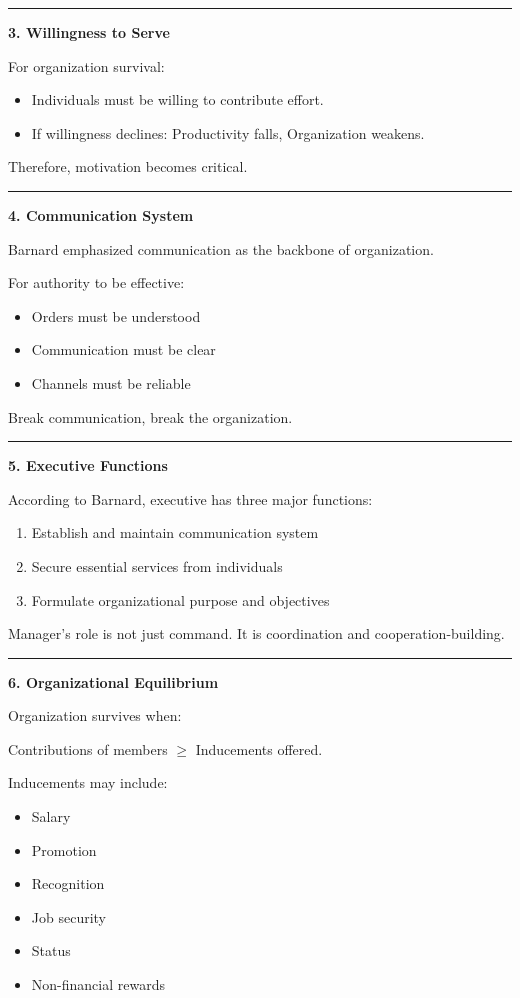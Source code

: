 \documentclass[10pt,a4paper]{article}
\newcommand{\separator}{\vspace{0.4em}\noindent\rule{\linewidth}{0.6pt}\vspace{0.4em}}
\begin{document}
\separator

\textbf{3. Willingness to Serve}

For organization survival:
\begin{itemize}
  \item Individuals must be willing to contribute effort.
  \item If willingness declines: Productivity falls, Organization weakens.
\end{itemize}

Therefore, motivation becomes critical.

\separator

\textbf{4. Communication System}

Barnard emphasized communication as the backbone of organization.

For authority to be effective:
\begin{itemize}
  \item Orders must be understood
  \item Communication must be clear
  \item Channels must be reliable
\end{itemize}

Break communication, break the organization.

\separator

\textbf{5. Executive Functions}

According to Barnard, executive has three major functions:

\begin{enumerate}
  \item Establish and maintain communication system
  \item Secure essential services from individuals
  \item Formulate organizational purpose and objectives
\end{enumerate}

Manager's role is not just command.
It is coordination and cooperation-building.

\separator

\textbf{6. Organizational Equilibrium}

Organization survives when:

\begin{center}
Contributions of members $\geq$ Inducements offered.
\end{center}

Inducements may include:
\begin{itemize}
  \item Salary
  \item Promotion
  \item Recognition
  \item Job security
  \item Status
  \item Non-financial rewards
\end{itemize}
\end{document}
